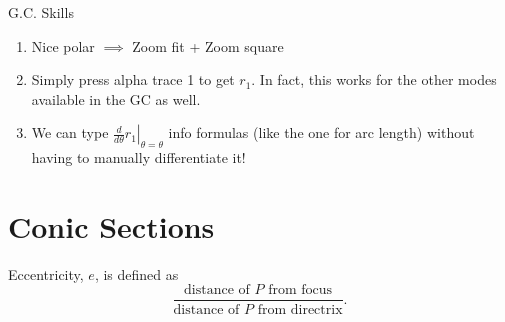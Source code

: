 \documentclass[oneside]{book}
\begin{document}
\begin{lbox}[colbacktitle=white, coltitle=black, colframe=black]{G.C. Skills} 
  \begin{enumerate}
    \item Nice polar \(\implies\) Zoom fit + Zoom square
    \item Simply press alpha trace 1 to get \(r_1\). In fact, this works for the other modes available in the GC as well. 
    \item We can type \(\left. \frac{d}{d\theta}{r_1} \right\rvert_{\theta=\theta}\) info formulas (like the one for arc length) without having to manually differentiate it!
  \end{enumerate}
\end{lbox}

\chapter{Conic Sections}
\begin{definition}{}{}
  Eccentricity, \(e\), is defined as 
  \[\frac{\text{distance of \(P\) from focus}}{\text{distance of \(P\) from directrix}}.\]
\end{definition}
\end{document}
